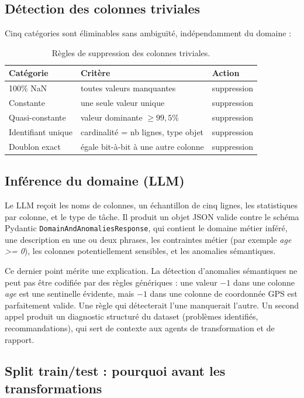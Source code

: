 \documentclass[12pt,a4paper]{article}
\begin{document}
\subsection{Détection des colonnes triviales}

Cinq catégories sont éliminables sans ambiguïté, indépendamment du domaine :

\begin{table}[H]
\centering
\begin{tabular}{lll}
\toprule
\textbf{Catégorie} & \textbf{Critère} & \textbf{Action} \\
\midrule
100\% NaN & toutes valeurs manquantes & suppression \\
Constante & une seule valeur unique & suppression \\
Quasi-constante & valeur dominante $\geq 99{,}5\%$ & suppression \\
Identifiant unique & cardinalité = nb lignes, type objet & suppression \\
Doublon exact & égale bit-à-bit à une autre colonne & suppression \\
\bottomrule
\end{tabular}
\caption{Règles de suppression des colonnes triviales.}
\end{table}

\subsection{Inférence du domaine (LLM)}

Le LLM reçoit les noms de colonnes, un échantillon de cinq lignes, les statistiques
par colonne, et le type de tâche. Il produit un objet JSON valide contre le schéma
Pydantic \texttt{DomainAndAnomaliesResponse}, qui contient le domaine métier inféré,
une description en une ou deux phrases, les contraintes métier (par exemple \textit{age >= 0}),
les colonnes potentiellement sensibles, et les anomalies sémantiques.

Ce dernier point mérite une explication. La détection d'anomalies sémantiques ne peut
pas être codifiée par des règles génériques : une valeur $-1$ dans une colonne
\textit{age} est une sentinelle évidente, mais $-1$ dans une colonne de coordonnée
GPS est parfaitement valide. Une règle qui détecterait l'une manquerait l'autre.
Un second appel produit un diagnostic structuré du dataset (problèmes identifiés,
recommandations), qui sert de contexte aux agents de transformation et de rapport.

\subsection{Split train/test : pourquoi avant les transformations}
\end{document}
